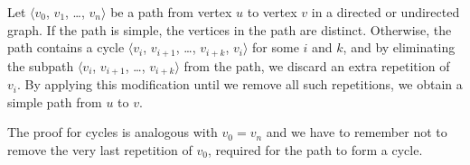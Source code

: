 \exercise
Let $\langle v_0$, $v_1$, \dots, $v_n\rangle$ be a path from vertex $u$ to vertex $v$ in a directed or undirected graph.
If the path is simple, the vertices in the path are distinct.
Otherwise, the path contains a cycle $\langle v_i$, $v_{i+1}$, \dots, $v_{i+k}$, $v_i\rangle$ for some $i$ and $k$, and by eliminating the subpath $\langle v_i$, $v_{i+1}$, \dots, $v_{i+k}\rangle$ from the path, we discard an extra repetition of $v_i$.
By applying this modification until we remove all such repetitions, we obtain a simple path from $u$ to $v$.

The proof for cycles is analogous with $v_0=v_n$ and we have to remember not to remove the very last repetition of $v_0$, required for the path to form a cycle.
